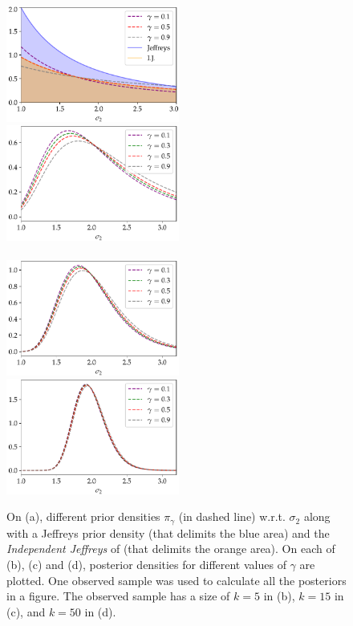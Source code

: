\begin{figure}[h]%
    \centering%
    \includegraphics[width=5.7cm]{figures/constrained-priors/priors_.pdf}\hspace*{1cm}%
    \includegraphics[width=5.7cm]{figures/constrained-priors/post5.pdf}\\
    \\[5pt]
    \includegraphics[width=5.7cm]{figures/constrained-priors/post15.pdf}\hspace*{1cm}%
    \includegraphics[width=5.7cm]{figures/constrained-priors/post50.pdf}\\
    \caption{On (a), different prior densities $\pi_\gamma$ (in dashed line) w.r.t. $\sigma_2$ along with a Jeffreys prior density (that delimits the blue area) and the \emph{Independent Jeffreys} of \cite{rubio_inference_2014} (that delimits the orange area). On each of (b), (c) and (d), posterior densities for different values of $\gamma$ are plotted. %
    One observed sample was used to calculate all the posteriors in a figure.
    The observed sample has a size of $k=5$ in (b), $k=15$ in (c), and $k=50$ in (d).\label{fig:priorpost}}
\end{figure}

